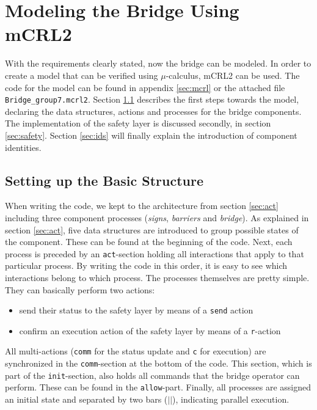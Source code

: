 \section{Modeling the Bridge Using mCRL2}
\label{sec:model}

With the requirements clearly stated, now the bridge can be modeled. In order to create a model that can be verified using $\mu$-calculus, mCRL2 can be used. The code for the model can be found in appendix \ref{sec:mcrl} or the attached file \texttt{Bridge\_group7.mcrl2}. Section \ref{sec:basic} describes the first steps towards the model, declaring the data structures, actions and processes for the bridge components. The implementation of the safety layer is discussed secondly, in section \ref{sec:safety}. Section \ref{sec:ids} will finally explain the introduction of component identities.

\subsection{Setting up the Basic Structure}
\label{sec:basic}
When writing the code, we kept to the architecture from section \ref{sec:act} including three component processes (\emph{signs}, \emph{barriers} and \emph{bridge}). As explained in section \ref{sec:act}, five data structures are introduced to group possible states of the component. These can be found at the beginning of the code. Next, each process is preceded by an \texttt{act}-section holding all interactions that apply to that particular process. By writing the code in this order, it is easy to see which interactions belong to which process. The processes themselves are pretty simple. They can basically perform two actions:
%
\begin{itemize}
	\item send their status to the safety layer by means of a \texttt{send} action
	\item confirm an execution action of the safety layer by means of a \texttt{r}-action
\end{itemize}
%
All multi-actions (\texttt{comm} for the status update and \texttt{c} for execution) are synchronized in the \texttt{comm}-section at the bottom of the code. This section, which is part of the \texttt{init}-section, also holds all commands that the bridge operator can perform. These can be found in the \texttt{allow}-part. Finally, all processes are assigned an initial state and separated by two bars ($||$), indicating parallel execution.


